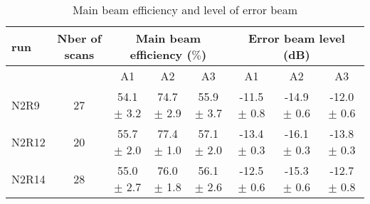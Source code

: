 \begin{table*}[!h]
\caption{Main beam efficiency and level of error beam}
\label{tab:MB}
\centering
\begin{tabular}{l| c | c c c | c c c}
\hline\hline
run  & Nber of scans & \multicolumn{3}{|c|}{Main beam efficiency ($\%$)} & \multicolumn{3}{c}{Error beam level (dB)} \\
\hline
     &               &  A1    &    A2   &  A3    & A1  &  A2  & A3   \\
            \hline
N2R9    & 27  &  54.1$\pm$ 3.2   &  74.7$\pm$ 2.9  & 55.9 $\pm$ 3.7   &  -11.5 $\pm$ 0.8    &  -14.9 $\pm$ 0.6   &  -12.0 $\pm$ 0.6   \\
N2R12   & 20  &  55.7$\pm$ 2.0   &  77.4$\pm$ 1.0  & 57.1 $\pm$ 2.0   &  -13.4 $\pm$ 0.3    &  -16.1 $\pm$ 0.3   &  -13.8 $\pm$ 0.3   \\
N2R14   & 28  &  55.0$\pm$ 2.7   &  76.0$\pm$ 1.8  & 56.1 $\pm$ 2.6   &  -12.5 $\pm$ 0.6    &  -15.3 $\pm$ 0.6   &  -12.7 $\pm$ 0.8   \\
            \hline\hline
\end{tabular}
\end{table*}


